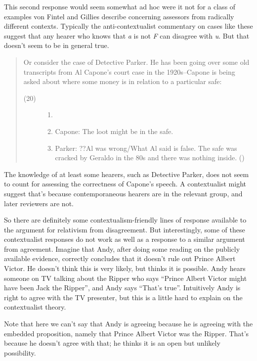\documentclass[
  10pt,
  letterpaper,
  DIV=11,
  numbers=noendperiod,
  twoside]{scrartcl}
\begin{document}
This second response would seem somewhat ad hoc were it not for a class
of examples von Fintel and Gillies describe concerning assessors from
radically different contexts. Typically the anti-contextualist
commentary on cases like these suggest that any hearer who knows that
\emph{a} is not \emph{F} can disagree with \emph{u}. But that doesn't
seem to be in general true.

\begin{quote}
Or consider the case of Detective Parker. He has been going over some
old transcripts from Al Capone's court case in the 1920s--Capone is
being asked about where some money is in relation to a particular safe:

\begin{description}
\item[(20)]
\begin{enumerate}
\def\labelenumi{\arabic{enumi}.}
\item[]
\item
  Capone: The loot might be in the safe.
\item
  Parker: ??Al was wrong/What Al said is false. The safe was cracked by
  Geraldo in the 80s and there was nothing inside.
  ()
\end{enumerate}
\end{description}
\end{quote}

The knowledge of at least some hearers, such as Detective Parker, does
not seem to count for assessing the correctness of Capone's speech. A
contextualist might suggest that's because contemporaneous hearers are
in the relevant group, and later reviewers are not.

So there are definitely some contextualism-friendly lines of response
available to the argument for relativism from disagreement. But
interestingly, some of these contextualist responses do not work as well
as a response to a similar argument from agreement. Imagine that Andy,
after doing some reading on the publicly available evidence, correctly
concludes that it doesn't rule out Prince Albert Victor. He doesn't
think this is very likely, but thinks it is possible. Andy hears someone
on TV talking about the Ripper who says ``Prince Albert Victor might
have been Jack the Ripper'', and Andy says ``That's true''. Intuitively
Andy is right to agree with the TV presenter, but this is a little hard
to explain on the contextualist theory.

Note that here we can't say that Andy is agreeing because he is agreeing
with the embedded proposition, namely that Prince Albert Victor was the
Ripper. That's because he doesn't agree with that; he thinks it is an
open but unlikely possibility.
\end{document}
